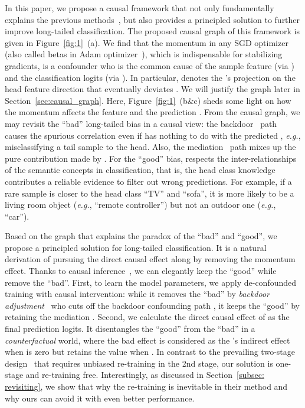 \documentclass{article}
\newcommand{\eg}{\textit{e.g.}}
\begin{document}
In this paper, we propose a causal framework that not only fundamentally explains the previous methods~\cite{shen2016relay, mahajan2018exploring, tan2020equalization, liu2019large, kang2019decoupling, zhou2019bbn}, but also provides a principled solution to further improve long-tailed classification. The proposed causal graph of this framework is given in Figure~\ref{fig:1}~(a). We find that the momentum  in any SGD optimizer~\cite{sutskever2013importance, qian1999momentum} (also called betas in Adam optimizer~\cite{kingma2014adam}), which is indispensable for stabilizing gradients, is a confounder who is the common cause of the sample feature  (via ) and the classification logits  (via ).  In particular,  denotes the 's projection on the head feature direction that eventually deviates . We will justify the graph later in Section~\ref{sec:causal_graph}. Here, Figure~\ref{fig:1}~(b\&c) sheds some light on how the momentum affects the feature  and the prediction . From the causal graph, we may revisit the ``bad'' long-tailed bias in a causal view: the backdoor~\cite{pearl1995causal} path  causes the spurious correlation even if  has nothing to do with the predicted , \eg, misclassifying a tail sample to the head. Also, the mediation~\cite{pearl2001direct} path  mixes up the pure contribution made by . For the ``good'' bias,  respects the inter-relationships of the semantic concepts in classification, that is, the head class knowledge contributes a reliable evidence to filter out wrong predictions. For example, if a rare sample is closer to the head class ``TV'' and ``sofa'', it is more likely to be a living room object (\eg, ``remote controller'') but not an outdoor one (\eg, ``car'').

Based on the graph that explains the paradox of the ``bad'' and ``good'', we propose a principled solution for long-tailed classification. It is a natural derivation of pursuing the direct causal effect along  by removing the momentum effect. Thanks to causal inference~\cite{pearl2016causal}, we can elegantly keep the ``good'' while remove the ``bad''. First, to learn the model parameters, we apply de-confounded training with  causal intervention: while it removes the ``bad'' by \emph{backdoor adjustment}~\cite{pearl1995causal} who cuts off the backdoor confounding path , it keeps the ``good'' by retaining the mediation . Second, we calculate the direct causal effect of  as the final prediction logits. It disentangles the ``good'' from the ``bad'' in a \emph{counterfactual} world, where the bad effect is considered as the 's indirect effect when  is zero but  retains the value when . In contrast to the prevailing two-stage design~\cite{kang2019decoupling} that requires unbiased re-training in the 2nd stage, our solution is one-stage and re-training free. Interestingly, as discussed in Section~\ref{subsec: revisiting}, we show that why the re-training is inevitable in their method and why ours can avoid it with even better performance.
\end{document}

